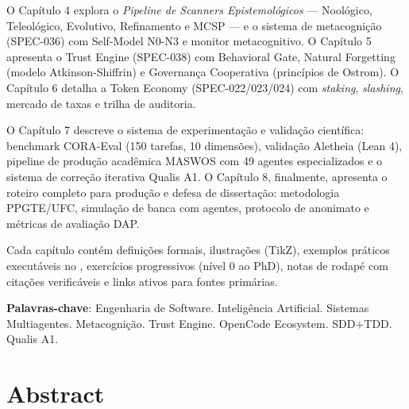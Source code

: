 O Capítulo 4 explora o \textit{Pipeline de Scanners Epistemológicos} --- 
Noológico, Teleológico, Evolutivo, Refinamento e MCSP --- e o sistema de 
metacognição (SPEC-036) com Self-Model N0-N3 e monitor metacognitivo. 
O Capítulo 5 apresenta o Trust Engine (SPEC-038) com Behavioral Gate, 
Natural Forgetting (modelo Atkinson-Shiffrin) e Governança Cooperativa 
(princípios de Ostrom). O Capítulo 6 detalha a Token Economy (SPEC-022/023/024) 
com \textit{staking}, \textit{slashing}, mercado de taxas e trilha de auditoria.

O Capítulo 7 descreve o sistema de experimentação e validação científica: 
benchmark CORA-Eval (150 tarefas, 10 dimensões), validação Aletheia 
(Lean 4), pipeline de produção acadêmica MASWOS com 49 agentes especializados 
e o sistema de correção iterativa Qualis A1. O Capítulo 8, finalmente, 
apresenta o roteiro completo para produção e defesa de dissertação: 
metodologia PPGTE/UFC, simulação de banca com agentes, protocolo de 
anonimato e métricas de avaliação DAP.

Cada capítulo contém definições formais, ilustrações (TikZ), exemplos 
práticos executáveis no \opencodeeco{}, exercícios progressivos (nível 0 
ao PhD), notas de rodapé com citações verificáveis e links ativos para 
fontes primárias.

\medskip
\noindent\textbf{Palavras-chave}: Engenharia de Software. Inteligência Artificial. 
Sistemas Multiagentes. Metacognição. Trust Engine. OpenCode Ecosystem. 
SDD+TDD. Qualis A1.

\chapter*{Abstract}
\label{ch:abstract}

